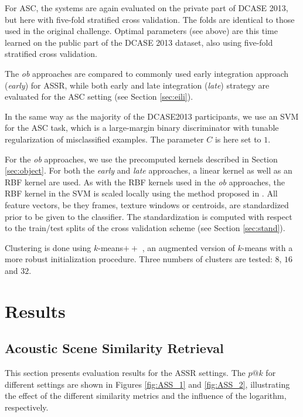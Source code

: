 \documentclass[journal]{IEEEtran}
\begin{document}
For ASC, the systems are again evaluated on the private part of DCASE 2013, but here with five-fold stratified cross validation. The folds are identical to those used in the original challenge. Optimal parameters (see above) are this time learned on the public part of the DCASE 2013 dataset, also using five-fold stratified cross validation.

The \emph{ob} approaches are compared to commonly used early integration approach (\emph{early}) for ASSR, while both early and late integration (\emph{late}) strategy are evaluated for the ASC setting (see Section \ref{sec:eili}).

In the same way as the majority of the DCASE2013 participants, we use an SVM for the ASC task, which is a large-margin binary discriminator with tunable regularization of misclassified examples. The parameter $C$ is here set to $1$.

For the \emph{ob} approaches, we use the precomputed kernels described in Section \ref{sec:object}. For both the \emph{early} and \emph{late} approaches, a linear kernel as well as an RBF kernel are used. As with the RBF kernels used in the \emph{ob} approaches, the RBF kernel in the SVM is scaled locally using the method proposed in \cite{selfTuneManor2004}. All feature vectors, be they frames, texture windows or centroids, are standardized prior to be given to the classifier. The standardization is computed with respect to the train/test splits of the cross validation scheme (see Section \ref{sec:stand}).

Clustering is done using $k$-means$++$ \cite{arthur2007k}, an augmented version of $k$-means with a more robust initialization procedure. Three numbers of clusters are tested: $8$, $16$ and $32$.

\section{Results \label{sec:results}}



\subsection{Acoustic Scene Similarity Retrieval}

This section presents evaluation results for the ASSR settings. The $p@k$ for different settings are shown in Figures \ref{fig:ASS_1} and \ref{fig:ASS_2}, illustrating the effect of the different similarity metrics and the influence of the logarithm, respectively.
\end{document}

